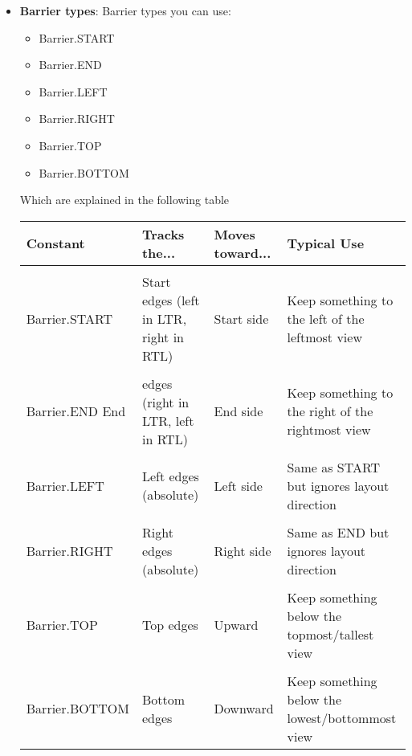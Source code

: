 \documentclass{report}
\begin{document}
\begin{itemize}
\begin{javacode}
                ...
            \end{javacode}

        \item \textbf{Barrier types}: Barrier types you can use:
            \begin{itemize}
                \item Barrier.START
                \item Barrier.END
                \item Barrier.LEFT
                \item Barrier.RIGHT
                \item Barrier.TOP
                \item Barrier.BOTTOM
            \end{itemize}
            Which are explained in the following table
            \bigbreak \noindent 
            \begin{center}
                \begin{tabular}{p{4cm}|p{3cm}|p{2cm}|p{3cm}}
                    Constant	&Tracks the...	&Moves toward...	&Typical Use \\
                    \hline \\
                    Barrier.START	&Start edges (left in LTR, right in RTL)	&Start side	&Keep something to the left of the leftmost view \\ && \\
                    Barrier.END	End &edges (right in LTR, left in RTL)	&End side	&Keep something to the right of the rightmost view \\&& \\ 
                    Barrier.LEFT	&Left edges (absolute)	&Left side	&Same as START but ignores layout direction \\ && \\
                    Barrier.RIGHT	&Right edges (absolute)	&Right side	&Same as END but ignores layout direction \\ && \\
                    Barrier.TOP	&Top edges	&Upward	&Keep something below the topmost/tallest view \\ && \\
                    Barrier.BOTTOM	&Bottom edges	&Downward	&Keep something below the lowest/bottommost view 
                \end{tabular}
            \end{center}







\end{itemize}
\end{document}
